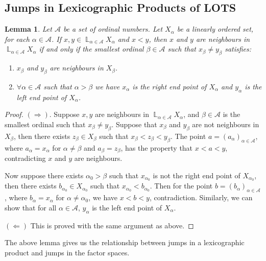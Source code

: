 \documentclass[12pt,oneside,english]{amsbook}
\numberwithin{equation}{section} %
\numberwithin{figure}{section} %
\theoremstyle{plain}
\numberwithin{section}{chapter}
\theoremstyle{plain}
\newtheorem{lem}[thm]{Lemma}
\DeclareMathOperator{\LP}{\mathbb{L}}
\begin{document}
\subsection{Jumps in Lexicographic Products of LOTS}
\begin{lem} \label{lem:ljump:1}
  Let $\mathcal{A}$ be a set of ordinal numbers. Let $X_{\alpha}$ be a linearly ordered set, for each $\alpha \in \mathcal{A}$. If $x , y \in \LP_{\alpha \in \mathcal{A}}X_{\alpha}$ and $x < y$, then $x$ and $y$ are neighbours in $\LP_{\alpha \in \mathcal{A}}X_{\alpha}$ if and only if the smallest ordinal $\beta \in \mathcal{A}$ such that $x_{\beta} \neq y_{\beta}$ satisfies:
  \begin{enumerate}
  \item $x_{\beta}$ and $y_{\beta}$ are neighbours in $X_{\beta}$.
  \item $\forall \alpha \in \mathcal{A}$ such that $\alpha > \beta$ we have $x_{\alpha}$ is the right end point of $X_{\alpha}$ and $y_{\alpha}$ is the left end point of $X_{\alpha}$.
  \end{enumerate}
\end{lem}
\begin{proof}
  $(\Rightarrow)$. Suppose $x,y$ are neighbours in $\LP_{\alpha \in \mathcal{A}}X_{\alpha}$, and  $\beta \in \mathcal{A}$ is the smallest ordinal such that $x_{\beta} \neq y_{\beta}$. Suppose that  $x_{\beta}$ and $y_{\beta}$ are not neighbours in $X_{\beta}$, then there exists $z_{\beta} \in X_{\beta}$ such that $x_{\beta} < z_{\beta} < y_{\beta}$. The point $a = (a_{\alpha})_{\alpha \in \mathcal{A}}$, where $a_{\alpha} = x_{\alpha}$ for $\alpha \neq \beta$ and $a_{\beta} = z_{\beta}$, has the property that $x < a < y$, contradicting $x$ and $y$ are neighbours.

  Now suppose there exists $\alpha_{0} > \beta$ such that $x_{\alpha_{0}}$ is not the right end point of $X_{\alpha_{0}}$, then there exists $b_{\alpha_{0}} \in X_{\alpha_{0}}$ such that $x_{\alpha_{0}} < b_{\alpha_{0}}$. Then for the point $b = (b_{\alpha})_{\alpha \in \mathcal{A}}$, where $b_{\alpha} = x_{\alpha}$ for $\alpha \neq \alpha_{0}$, we have $x < b < y$, contradiction. Similarly, we can show that for all $\alpha \in \mathcal{A}$, $y_{\alpha}$ is the left end point of $X_{\alpha}$.

  $(\Leftarrow)$ This is proved with the same argument as above.
\end{proof}

The above lemma gives us the relationship between jumps in a lexicographic product and jumps in the factor spaces.
\end{document}
